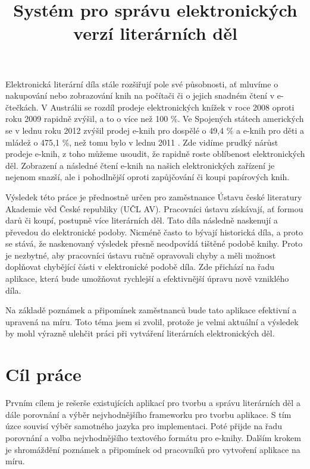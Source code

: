 \documentclass[thesis=B,czech]{FITthesis}[2012/06/26]
\title{Systém pro správu elektronických verzí literárních děl}
\begin{document}

\begin{introduction}

    Elektronická literární díla stále rozšiřují pole své působnosti, ať mluvíme o nakupování nebo zobrazování knih na počítači či o jejich snadném čtení v e-čtečkách. V Austrálii se rozdíl prodeje elektronických knížek v roce 2008 oproti roku 2009 rapidně zvýšil, a to o více než 100 \%. Ve Spojených státech amerických se v lednu roku 2012 zvýšil prodej e-knih pro dospělé o 49,4 \% a e-knih pro děti a mládež o 475,1 \%, než tomu bylo v lednu 2011 \cite{info}. Zde vidíme prudký nárůst prodeje e-knih, z toho můžeme usoudit, že rapidně roste oblíbenost elektronických děl. Zobrazení a následné čtení e-knih na našich elektronických zařízení je nejenom snazší, ale i pohodlnější oproti zapůjčování či koupi papírových knih.

	Výsledek této práce je přednostně určen pro zaměstnance Ústavu české literatury Akademie věd České republiky (UČL AV). Pracovníci ústavu získávají, ať formou darů či koupí, postupně více literárních děl. Tato díla následně naskenují a převedou do elektronické podoby. Nicméně často to bývají historická díla, a proto se stává, že naskenovaný výsledek přesně neodpovídá tištěné podobě knihy. Proto je nezbytné, aby pracovníci ústavu ručně opravovali chyby a měli možnost doplňovat chybějící části v elektronické podobě díla. Zde přichází na řadu aplikace, která bude umožňovat rychlejší a efektivnější úpravu nově vzniklého díla.

	Na základě poznámek a připomínek zaměstnanců bude tato aplikace efektivní a upravená na míru. Toto téma jsem si zvolil, protože je velmi aktuální a výsledek by mohl výrazně ulehčit práci při vytváření literárních elektronických děl.

    \section{Cíl práce}
    
        Prvním cílem je rešerše existujících aplikací pro tvorbu a správu literárních děl a dále porovnání a výběr nejvhodnějšího frameworku pro tvorbu aplikace. S tím úzce souvisí výběr samotného jazyka pro implementaci. Poté přijde na řadu  porovnání a volba nejvhodnějšího textového formátu pro e-knihy. Dalším krokem je shromáždění poznámek a připomínek od pracovníků pro vytvoření aplikace na míru.
    

\end{introduction}
\end{document}
